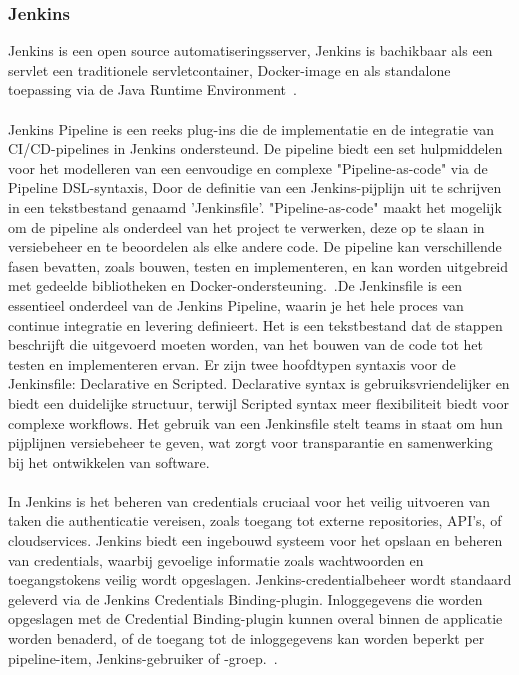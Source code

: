 \subsubsection{Jenkins}
Jenkins is een open source automatiseringsserver, Jenkins is bachikbaar als een servlet een traditionele servletcontainer, Docker-image en als standalone toepassing via de Java Runtime Environment~\autocite{jenkinsinstalling}. 
\\\\
Jenkins Pipeline is een reeks plug-ins die de implementatie en de integratie van CI/CD-pipelines in Jenkins ondersteund. De pipeline biedt een set hulpmiddelen voor het modelleren van een eenvoudige en complexe "Pipeline-as-code" via de Pipeline DSL-syntaxis, Door de definitie van een Jenkins-pijplijn uit te schrijven in een tekstbestand genaamd 'Jenkinsfile'. "Pipeline-as-code" maakt het mogelijk om de pipeline als onderdeel van het project te verwerken, deze op te slaan in versiebeheer en te beoordelen als elke andere code. De pipeline kan verschillende fasen bevatten, zoals bouwen, testen en implementeren, en kan worden uitgebreid met gedeelde bibliotheken en Docker-ondersteuning.~\autocite{jenkinspipeline}.De Jenkinsfile is een essentieel onderdeel van de Jenkins Pipeline, waarin je het hele proces van continue integratie en levering definieert. Het is een tekstbestand dat de stappen beschrijft die uitgevoerd moeten worden, van het bouwen van de code tot het testen en implementeren ervan. Er zijn twee hoofdtypen syntaxis voor de Jenkinsfile: Declarative en Scripted. Declarative syntax is gebruiksvriendelijker en biedt een duidelijke structuur, terwijl Scripted syntax meer flexibiliteit biedt voor complexe workflows. Het gebruik van een Jenkinsfile stelt teams in staat om hun pijplijnen versiebeheer te geven, wat zorgt voor transparantie en samenwerking bij het ontwikkelen van software.~\autocite{jenkinsjenkinsfile}
\\\\
In Jenkins is het beheren van credentials cruciaal voor het veilig uitvoeren van taken die authenticatie vereisen, zoals toegang tot externe repositories, API’s, of cloudservices. Jenkins biedt een ingebouwd systeem voor het opslaan en beheren van credentials, waarbij gevoelige informatie zoals wachtwoorden en toegangstokens veilig wordt opgeslagen. Jenkins-credentialbeheer wordt standaard geleverd via de Jenkins Credentials Binding-plugin. Inloggegevens die worden opgeslagen met de Credential Binding-plugin kunnen overal binnen de applicatie worden benaderd, of de toegang tot de inloggegevens kan worden beperkt per pipeline-item, Jenkins-gebruiker of -groep.~\autocite{jenkinscredentials}.

